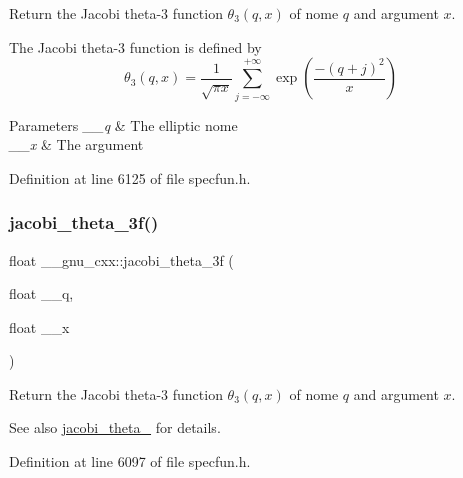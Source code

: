 Return the Jacobi theta-\/3 function $ \theta_3(q,x) $ of nome $ q $ and argument $ x $.

The Jacobi theta-\/3 function is defined by \[ \theta_3(q,x) = \frac{1}{\sqrt{\pi x}} \sum_{j=-\infty}^{+\infty} \exp\left( \frac{-(q+j)^2}{x} \right) \]


\begin{DoxyParams}{Parameters}
{\em \+\_\+\+\_\+q} & The elliptic nome \\
\hline
{\em \+\_\+\+\_\+x} & The argument \\
\hline
\end{DoxyParams}


Definition at line 6125 of file specfun.\+h.

\mbox{\label{group__gnu__math__spec__func_ga6ff9738978be029e90e1f144ab4aa165}} 
\subsubsection{\texorpdfstring{jacobi\+\_\+theta\+\_\+3f()}{jacobi\_theta\_3f()}}
{\footnotesize\ttfamily float \+\_\+\+\_\+gnu\+\_\+cxx\+::jacobi\+\_\+theta\+\_\+3f (\begin{DoxyParamCaption}\item[{float}]{\+\_\+\+\_\+q,  }\item[{float}]{\+\_\+\+\_\+x }\end{DoxyParamCaption})\hspace{0.3cm}{\ttfamily [inline]}}

Return the Jacobi theta-\/3 function $ \theta_3(q,x) $ of nome $ q $ and argument $ x $.

\begin{DoxySeeAlso}{See also}
\hyperlink{group__gnu__math__spec__func_gaf4eac2990db1dadba66ae688ceaa6403}{jacobi\+\_\+theta\+\_} for details. 
\end{DoxySeeAlso}


Definition at line 6097 of file specfun.\+h.

\mbox{\label{group__gnu__math__spec__func_ga313109bbf08d81e93196eb73c2047dd2}} 
